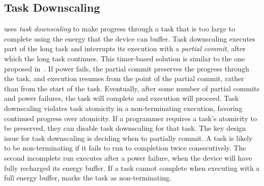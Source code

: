 
\subsection{Task Downscaling}
\label{sec:task_downsizing}

\sys uses {\em task downscaling} to make progress through a task that is too large to complete using the energy that the device can buffer. Task downscaling executes part of the long task and interrupts its execution with a {\em partial commit}, after which the long task continues. This timer-based solution is similar to the one proposed in~\cite{ratchet}. If power fails, the partial commit preserves the progress through the task, and execution resumes from the point of the partial commit, rather than from the start of the task. Eventually, after some number of partial commits and power failures, the task will complete and execution will proceed. Task downscaling violates task atomicity in a non-terminating execution, favoring continued progress over atomicity. If a programmer requires a task's atomicity to be preserved, they can disable task downscaling for that task. The key design issue for task downscaling is deciding when to partially commit. A task is likely to be non-terminating if it fails to run to completion twice consecutively. The second incomplete run executes after a power failure, when the device will have fully recharged its energy buffer. If a task cannot complete when executing with a full energy buffer, \sys marks the task as non-terminating.